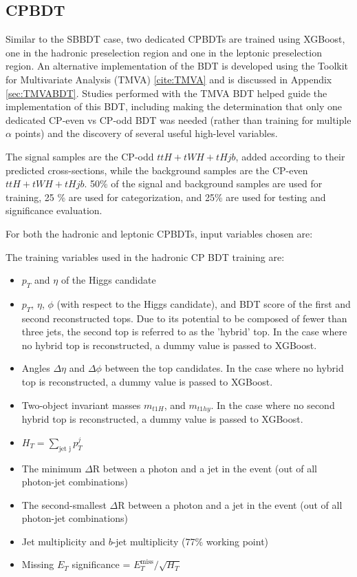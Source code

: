 \subsection{CPBDT}

Similar to the SBBDT case, two dedicated CPBDTs are trained using XGBoost, one in the hadronic preselection region and one in the leptonic preselection region. An alternative implementation of the BDT is developed using the Toolkit for Multivariate Analysis (TMVA) \ref{cite:TMVA} and is discussed in Appendix \ref{sec:TMVABDT}. Studies performed with the TMVA BDT helped guide the implementation of this BDT, including making the determination that only one dedicated CP-even vs CP-odd BDT was needed (rather than training for multiple $\alpha$ points) and the discovery of several useful high-level variables.

The signal samples are the CP-odd $ttH+tWH+tHjb$, added according to their predicted cross-sections, while the background samples are the CP-even $ttH+tWH+tHjb$. 50\% of the signal and background samples are used for training, 25 \% are used for categorization, and 25\% are used for testing and significance evaluation.

For both the hadronic and leptonic CPBDTs, input variables chosen are:

The training variables used in the hadronic CP BDT training are:
\begin{itemize}
\item $p_{T}$ and $\eta$ of the Higgs candidate
\item $p_{T}$, $\eta$, $\phi$ (with respect to the Higgs candidate), and BDT score of the first and second reconstructed tops. Due to its potential to be composed of fewer than three jets, the second top is referred to as the 'hybrid' top. In the case where no hybrid top is reconstructed, a dummy value is passed to XGBoost.
\item Angles $\Delta\eta$ and $\Delta\phi$ between the top candidates. In the case where no hybrid top is reconstructed, a dummy value is passed to XGBoost.
\item Two-object invariant masses $m_{t1H}$, and $m_{t1hy}$. In the case where no second hybrid top is reconstructed, a dummy value is passed to XGBoost.
\item $H_{T} = \sum_\text{jet j} p^{j}_{T}$
\item The minimum $\Delta$R between a photon and a jet in the event (out of all photon-jet combinations)
\item The second-smallest $\Delta$R between a photon and a jet in the event (out of all photon-jet combinations)
\item Jet multiplicity and $b$-jet multiplicity (77\% working point)
\item Missing $E_{T}$ significance = $E_{T}^\text{miss}/\sqrt{H_{T}}$
\end{itemize}

